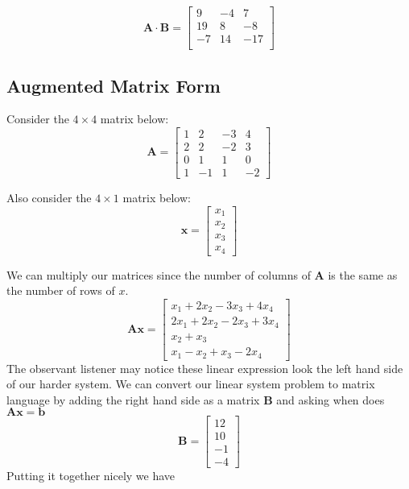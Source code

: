\documentclass{article}
\begin{document}
\[
\mathbf{A} \cdot \mathbf{B} =
\begin{bmatrix}
    9 & -4 & 7 \\
    19 & 8 & -8 \\
    -7 & 14 & -17 \\
\end{bmatrix}
\]

\newpage

\subsection*{Augmented Matrix Form}

Consider the \(4 \times 4\) matrix below:
\[
\mathbf{A} =
\begin{bmatrix}
    1 & 2 & -3 & 4 \\
    2 & 2 & -2 & 3 \\
    0 & 1 & 1 & 0 \\
    1 & -1 & 1 & -2
\end{bmatrix}
\]

Also consider the \(4 \times 1\) matrix below:
\[
\mathbf{x} =
\begin{bmatrix}
    x_1 \\
    x_2 \\
    x_3 \\
    x_4
\end{bmatrix}
\]

We can multiply our matrices since the number of columns of $\mathbf{A}$ is the same as the number of rows of $x$.
\[
\mathbf{Ax} =
\begin{bmatrix}
    x_1 + 2x_2 - 3x_3 + 4x_4 \\
    2x_1 + 2x_2 - 2x_3 + 3x_4 \\
    x_2 + x_3 \\
    x_1 - x_2 + x_3 - 2x_4
\end{bmatrix}
\]
The observant listener may notice these linear expression look the left hand side of our harder system. We can convert our linear system problem to matrix language by adding the right hand side as a matrix $\mathbf{B}$ and asking when does $\mathbf{Ax} = \mathbf{b}$
\[
\mathbf{B} =
\begin{bmatrix}
    12 \\
    10 \\
    -1 \\
    -4
\end{bmatrix}
\]
Putting it together nicely we have
\end{document}
